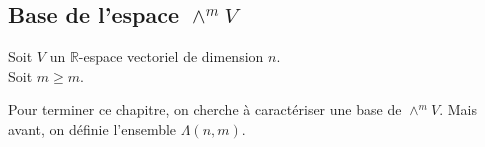 \documentclass[../geometrie.tex]{subfiles}
\begin{document}
	\subsection{Base de l'espace \texorpdfstring{$\wedge^{m} V$}{des formes linéaires}}{
		\noindent Soit $V$ un $\mathbb{R}$-espace vectoriel de dimension $n$. \\
		\noindent Soit $m \geq m$.

		\vspace{1em}

		Pour terminer ce chapitre, on cherche à caractériser une base de $\wedge^{m} V$. Mais avant, on définie l'ensemble $\Lambda(n, m)$.


	}
\end{document}
